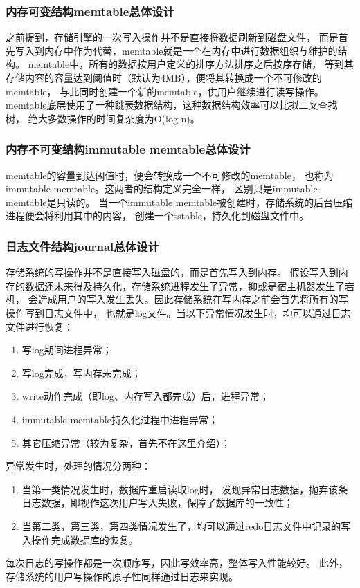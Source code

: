 		\subsubsection{内存可变结构memtable总体设计}
		
		之前提到，存储引擎的一次写入操作并不是直接将数据刷新到磁盘文件，
		而是首先写入到内存中作为代替，memtable就是一个在内存中进行数据组织与维护的结构。
		memtable中，所有的数据按用户定义的排序方法排序之后按序存储，
		等到其存储内容的容量达到阈值时（默认为4MB），便将其转换成一个不可修改的memtable，
		与此同时创建一个新的memtable，供用户继续进行读写操作。
		memtable底层使用了一种跳表数据结构，这种数据结构效率可以比拟二叉查找树，
		绝大多数操作的时间复杂度为O(log n)。

		\subsubsection{内存不可变结构immutable memtable总体设计}

		memtable的容量到达阈值时，便会转换成一个不可修改的memtable，
		也称为immutable memtable。这两者的结构定义完全一样，
		区别只是immutable memtable是只读的。
		当一个immutable memtable被创建时，存储系统的后台压缩进程便会将利用其中的内容，
		创建一个sstable，持久化到磁盘文件中。

		\subsubsection{日志文件结构journal总体设计}

		存储系统的写操作并不是直接写入磁盘的，而是首先写入到内存。
		假设写入到内存的数据还未来得及持久化，存储系统进程发生了异常，抑或是宿主机器发生了宕机，
		会造成用户的写入发生丢失。因此存储系统在写内存之前会首先将所有的写操作写到日志文件中，
		也就是log文件。当以下异常情况发生时，均可以通过日志文件进行恢复：

		\begin{enumerate}
			\item 写log期间进程异常；
			\item 写log完成，写内存未完成；
			\item write动作完成（即log、内存写入都完成）后，进程异常；
			\item immutable memtable持久化过程中进程异常；
			\item 其它压缩异常（较为复杂，首先不在这里介绍）；
		\end{enumerate}
	
	异常发生时，处理的情况分两种：
		\begin{enumerate}
			\item 当第一类情况发生时，数据库重启读取log时，
			发现异常日志数据，抛弃该条日志数据，即视作这次用户写入失败，保障了数据库的一致性；
			\item 当第二类，第三类，第四类情况发生了，均可以通过redo日志文件中记录的写入操作完成数据库的恢复。
		\end{enumerate}
		每次日志的写操作都是一次顺序写，因此写效率高，整体写入性能较好。
		此外，存储系统的用户写操作的原子性同样通过日志来实现。

